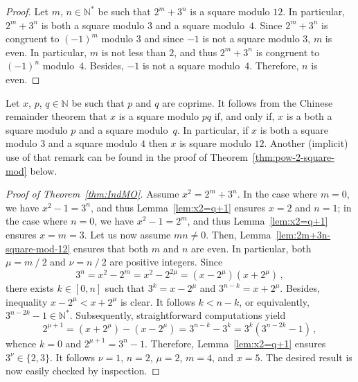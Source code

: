 \documentclass[12pt]{article}
\newcommand{\bN}{\mathbb{N}} %
\newcommand{\bNast}{\bN^*}
\newcommand{\binover}{\mathbin{/}}
\theoremstyle{definition}
\begin{document}
   \begin{proof}
     Let $m$, $n \in \bNast$ be such that $2^m + 3^n$ is a square modulo $12$.
     In particular, $2^m + 3^n$ is both a square modulo $3$ and a square modulo~$4$.
     Since $2^m + 3^n$ is congruent to ${(- 1)}^m$ modulo $3$ and since $- 1$ is not a square modulo $3$,
     $m$ is even.
     In particular, $m$ is not less than $2$, and thus $2^m + 3^n$ is congruent to ${(- 1)}^n$ modulo~$4$.
     Besides, $- 1$ is not a square modulo~$4$.
     Therefore, $n$ is even.
   \end{proof}

   Let $x$, $p$, $q \in \bN$ be such that $p$ and $q$ are coprime.
   It follows from the Chinese remainder theorem that
   $x$ is a square modulo $p q$
   if, and only if, $x$ is a both a square modulo $p$ and a square modulo~$q$.
   In particular, if $x$ is both a square modulo $3$ and a square modulo $4$ then $x$ is square modulo $12$.
   Another (implicit) use of that remark can be found in the proof of Theorem~\ref{thm:pow-2-square-mod} below.

   
   \begin{proof}[Proof of Theorem~\ref{thm:IndMO}]
     Assume $x^2 = 2^m + 3^n$.
     In the case where $m = 0$,
     we have $x^2 - 1 = 3^n$,
     and thus Lemma~\ref{lem:x2=q+1} ensures $x = 2$ and $n = 1$;
     in the case where $n = 0$,
     we have $x^2 - 1 = 2^m$,
     and thus Lemma~\ref{lem:x2=q+1} ensures $x = m = 3$.
     Let us now assume $mn \ne 0$.
     Then, Lemma~\ref{lem:2m+3n-square-mod-12} ensures that both $m$ and $n$ are even.
     In particular, both $\mu = m \binover 2$ and $\nu = n \binover 2$ are positive integers.
     Since 
     $$
     3^n = x^2 - 2^m = x^2 - 2^{2\mu} = (x - 2^\mu)(x + 2^\mu) \,, 
     $$
     there exists $k \in [0, n]$ such that $3^k = x - 2^\mu$ and $3^{n - k} = x + 2^\mu$.
     Besides, inequality $x - 2^\mu < x + 2^\mu$ is clear. 
     It follows $k < n - k$, or equivalently, $3^{n - 2 k} - 1 \in \bNast$.
     Subsequently, straightforward computations yield
     $$
     2^{\mu + 1} = (x + 2^\mu) - (x - 2^\mu) = 3^{n - k} - 3^k = 3^k \left( 3^{n - 2k} - 1 \right) \,,
     $$
     whence $k = 0$ and $2^{\mu + 1} = 3^n - 1$.
     Therefore, 
     Lemma~\ref{lem:x2=q+1} ensures $3^\nu \in \{ 2, 3 \}$.
     It follows $\nu = 1$, $n = 2$, $\mu = 2$, $m = 4$, and $x = 5$.
     The desired result is now easily checked by inspection. 
  \end{proof}
\end{document}
